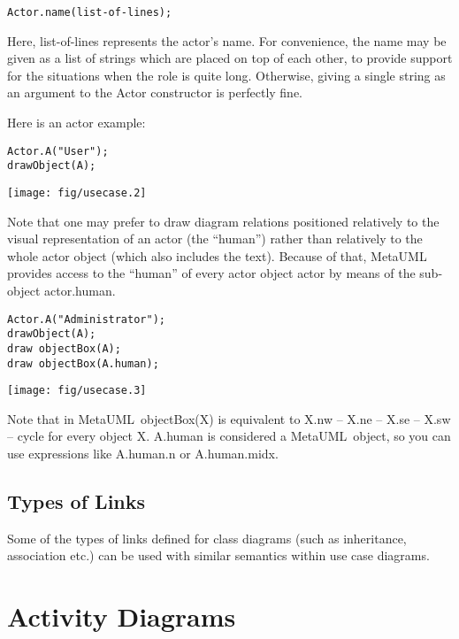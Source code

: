 \documentclass{article}
\newcommand{\code}{\ttfamily}
\newcommand{\metauml}{MetaUML}
\begin{document}
\begin{verbatim}
Actor.name(list-of-lines);
\end{verbatim}

Here, {\code list-of-lines} represents the actor's name. For convenience, the name may be
given as a list of strings which are placed on top of each other, to provide support for
the situations when the role is quite long. Otherwise, giving a single string
as an argument to the Actor constructor is perfectly fine.

Here is an actor example:

\begin{multicols}{2}
\begin{verbatim}
Actor.A("User");
drawObject(A);
\end{verbatim}
\columnbreak
\hspace{1cm}\texttt{[image: fig/usecase.2]}
\end{multicols}

Note that one may prefer to draw diagram relations positioned relatively to
the visual representation of an actor (the ``human'') rather than relatively to the whole
actor object (which also includes the text). Because of that, MetaUML provides access
to the ``human'' of every actor object {\code actor} by means of the sub-object {\code actor.human}.

\begin{multicols}{2}
\begin{verbatim}
Actor.A("Administrator");
drawObject(A);
draw objectBox(A);
draw objectBox(A.human);
\end{verbatim}
\columnbreak
\hspace{1cm}\texttt{[image: fig/usecase.3]}
\end{multicols}

Note that in \metauml\ {\code objectBox(X)} is equivalent to {\code X.nw -- X.ne -- X.se -- X.sw -- cycle} for every object {\code X}. {\code A.human} is considered a \metauml\ object, so you can use expressions like {\code A.human.n} or {\code A.human.midx}.

\subsection{Types of Links}

Some of the types of links defined for class diagrams (such as inheritance, association etc.) can be used with similar semantics within use case diagrams.

\section{Activity Diagrams}
\end{document}
